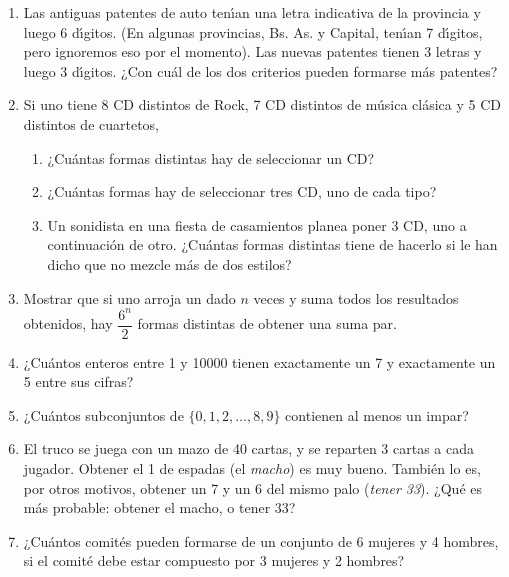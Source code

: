 \documentclass[12pt,spanish,makeidx]{amsbook}
\begin{document}
\begin {enumerate}
\smallskip

\item Las antiguas patentes de auto ten\'\i an una letra indicativa de la provincia y luego 6 d\'\i gitos. (En algunas provincias, Bs. As. y Capital, ten\'\i an 7 d\'\i gitos, pero ignoremos eso por el momento). Las nuevas patentes tienen 3 letras y luego 3 d\'\i gitos. ¿Con cu\'al de los dos criterios pueden formarse m\'as patentes?

\smallskip

\item Si uno tiene 8 CD distintos de Rock, 7 CD distintos de m\'usica cl\'asica y 5 CD distintos de cuartetos,
\begin{enumerate}
	\item ¿Cu\'antas formas distintas hay de seleccionar un CD?

	\item ¿Cu\'antas formas hay de seleccionar tres CD, uno de cada tipo?

	\item Un sonidista en una fiesta de casamientos planea poner 3 CD, uno a continuaci\'on de otro. ¿Cu\'antas formas distintas tiene de hacerlo si le han dicho que no mezcle m\'as de dos estilos?
\end{enumerate}

\smallskip

\item Mostrar que si uno arroja un dado $n$ veces y suma todos los resultados obtenidos, hay $\dfrac{6^n}{2}$ formas distintas de obtener una suma par.

\smallskip

\item ¿Cu\'antos enteros entre 1 y 10000 tienen exactamente un 7 y exactamente un 5 entre sus cifras?

\smallskip

\item ¿Cu\'antos subconjuntos de $\{0,1,2,\dots,8,9\}$ contienen al menos un impar?

\smallskip

\item El truco se juega con un mazo de 40 cartas, y se reparten 3 cartas a cada jugador. Obtener el 1 de espadas (el {\it macho}) es muy bueno. Tambi\'en lo es, por otros motivos, obtener un 7 y un 6 del mismo palo ({\it tener 33}). ¿Qu\'e es m\'as probable: obtener el macho, o tener 33?

\smallskip

\item ¿Cu\'antos comit\'es pueden formarse de un conjunto de 6 mujeres y 4 hombres, si el comit\'e debe estar compuesto por 3 mujeres y 2 hombres?


\end{enumerate}
\end{document}
